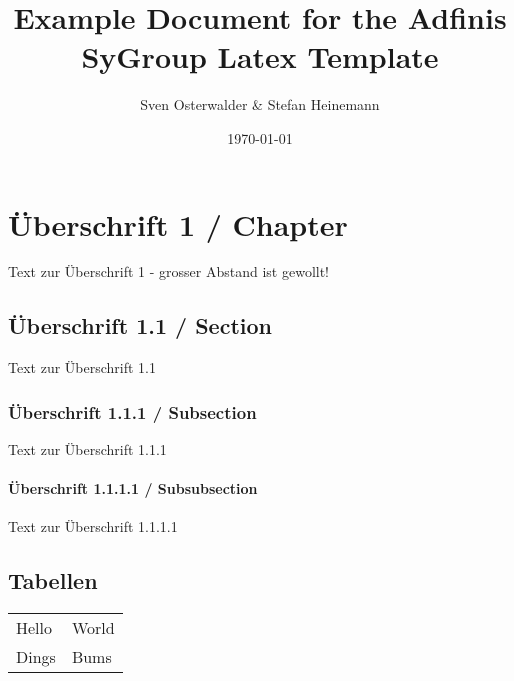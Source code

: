 \documentclass[oneside]{report}
\title{Example Document for the Adfinis SyGroup Latex Template}
\author{Sven Osterwalder \& Stefan Heinemann}
\date{\today}
\begin{document}
\maketitle{}
%

\tableofcontents{}

\chapter{Überschrift 1 / Chapter}

Text zur Überschrift 1 - grosser Abstand ist gewollt!

\section{Überschrift 1.1 / Section}

Text zur Überschrift 1.1

\subsection{Überschrift 1.1.1 / Subsection}

Text zur Überschrift 1.1.1

\subsubsection{Überschrift 1.1.1.1 / Subsubsection}

Text zur Überschrift 1.1.1.1


\section{Tabellen}

\begin{tabulary}{\linewidth}{X  | X}
	Hello & World \\
	Dings & Bums \\
\end{tabulary}
\end{document}
